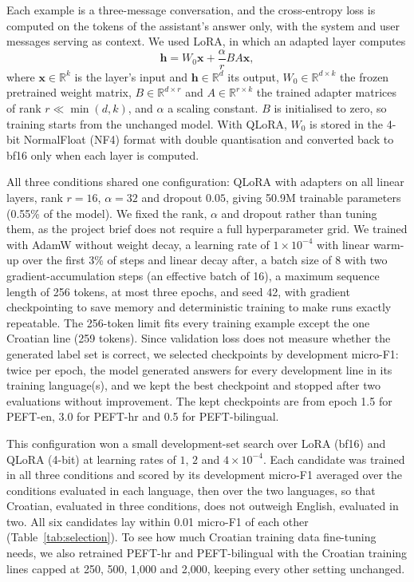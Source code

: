 Each example is a three-message conversation, and the cross-entropy loss is computed on the tokens of the assistant's answer only, with the system and user messages serving as context. We used LoRA, in which an adapted layer computes
\begin{equation}
    \mathbf{h} = W_0 \mathbf{x} + \frac{\alpha}{r} B A \mathbf{x},
    \label{eq:lora}
\end{equation}
where $\mathbf{x} \in \mathbb{R}^{k}$ is the layer's input and $\mathbf{h} \in \mathbb{R}^{d}$ its output, $W_0 \in \mathbb{R}^{d \times k}$ the frozen pretrained weight matrix, $B \in \mathbb{R}^{d \times r}$ and $A \in \mathbb{R}^{r \times k}$ the trained adapter matrices of rank $r \ll \min(d, k)$, and $\alpha$ a scaling constant. $B$ is initialised to zero, so training starts from the unchanged model. With QLoRA, $W_0$ is stored in the 4-bit NormalFloat (NF4) format with double quantisation and converted back to bf16 only when each layer is computed.

All three conditions shared one configuration: QLoRA with adapters on all linear layers, rank $r = 16$, $\alpha = 32$ and dropout $0.05$, giving 50.9M trainable parameters (0.55\% of the model). We fixed the rank, $\alpha$ and dropout rather than tuning them, as the project brief does not require a full hyperparameter grid. We trained with AdamW without weight decay, a learning rate of $1 \times 10^{-4}$ with linear warm-up over the first 3\% of steps and linear decay after, a batch size of 8 with two gradient-accumulation steps (an effective batch of 16), a maximum sequence length of 256 tokens, at most three epochs, and seed 42, with gradient checkpointing to save memory and deterministic training to make runs exactly repeatable. The 256-token limit fits every training example except the one Croatian line (259 tokens). Since validation loss does not measure whether the generated label set is correct, we selected checkpoints by development micro-F1: twice per epoch, the model generated answers for every development line in its training language(s), and we kept the best checkpoint and stopped after two evaluations without improvement. The kept checkpoints are from epoch 1.5 for PEFT-en, 3.0 for PEFT-hr and 0.5 for PEFT-bilingual.

This configuration won a small development-set search over LoRA (bf16) and QLoRA (4-bit) at learning rates of $1$, $2$ and $4 \times 10^{-4}$. Each candidate was trained in all three conditions and scored by its development micro-F1 averaged over the conditions evaluated in each language, then over the two languages, so that Croatian, evaluated in three conditions, does not outweigh English, evaluated in two. All six candidates lay within 0.01 micro-F1 of each other (Table~\ref{tab:selection}). To see how much Croatian training data fine-tuning needs, we also retrained PEFT-hr and PEFT-bilingual with the Croatian training lines capped at 250, 500, 1,000 and 2,000, keeping every other setting unchanged.

